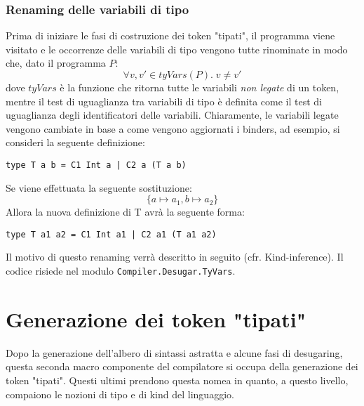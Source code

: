\documentclass[10pt,a4paper]{article}
\begin{document}
\subsubsection{Renaming delle variabili di tipo}
Prima di iniziare le fasi di costruzione dei token "tipati", il programma viene visitato e le occorrenze delle variabili
di tipo vengono tutte rinominate in modo che, dato il programma $ P $:
\[ \forall v, v' \in tyVars(P). \; v \neq v' \]
dove $ tyVars $ è la funzione che ritorna tutte le variabili \textit{non legate} di un token, mentre il test di uguaglianza
tra variabili di tipo è definita come il test di uguaglianza degli identificatori delle variabili.
Chiaramente, le variabili legate vengono cambiate in base a come vengono aggiornati i binders, ad esempio, si consideri
la seguente definizione:
\begin{lstlisting}
type T a b = C1 Int a | C2 a (T a b)
\end{lstlisting}
Se viene effettuata la seguente sostituzione:
\[ \{ a \mapsto a_1, b \mapsto a_2 \} \]
Allora la nuova definizione di T avrà la seguente forma:
\begin{lstlisting}
type T a1 a2 = C1 Int a1 | C2 a1 (T a1 a2)
\end{lstlisting}
Il motivo di questo renaming verrà descritto in seguito (cfr. Kind-inference). Il codice risiede nel modulo
\texttt{Compiler.Desugar.TyVars}.

\section{Generazione dei token "tipati"}
Dopo la generazione dell'albero di sintassi astratta e alcune fasi di desugaring, questa seconda macro componente del
compilatore si occupa della generazione dei token "tipati". Questi ultimi prendono questa nomea in quanto, a questo
livello, compaiono le nozioni di tipo e di kind del linguaggio.
\newline
\end{document}
